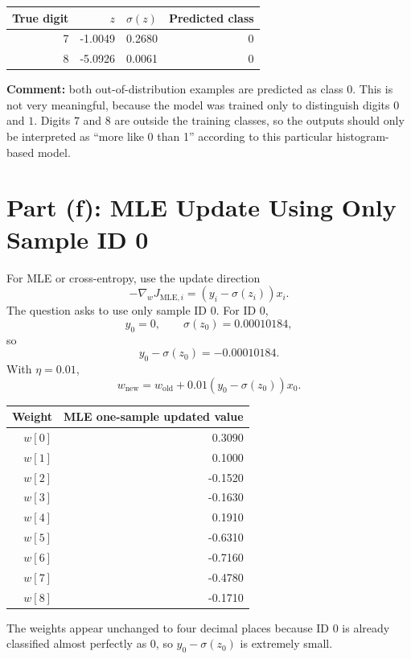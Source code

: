 \documentclass[11pt]{article}
\begin{document}
\begin{center}
\begin{tabular}{rrrr}
\toprule
True digit & \(z\) & \(\sigma(z)\) & Predicted class \\
\midrule
7 & -1.0049 & 0.2680 & 0 \\
8 & -5.0926 & 0.0061 & 0 \\
\bottomrule
\end{tabular}
\end{center}

\textbf{Comment:} both out-of-distribution examples are predicted as class \(0\).
This is not very meaningful, because the model was trained only to distinguish
digits \(0\) and \(1\). Digits \(7\) and \(8\) are outside the training classes, so the
outputs should only be interpreted as ``more like 0 than 1'' according to this
particular histogram-based model.

\section*{Part (f): MLE Update Using Only Sample ID 0}

For MLE or cross-entropy, use the update direction
\[
    -\nabla_w J_{\text{MLE},i}
    =
    (y_i-\sigma(z_i))x_i.
\]
The question asks to use only sample ID 0. For ID 0,
\[
    y_0=0,
    \qquad
    \sigma(z_0)=0.00010184,
\]
so
\[
    y_0-\sigma(z_0) = -0.00010184.
\]
With \(\eta=0.01\),
\[
    w_{\text{new}} = w_{\text{old}} + 0.01(y_0-\sigma(z_0))x_0.
\]

\begin{center}
\begin{tabular}{rr}
\toprule
Weight & MLE one-sample updated value \\
\midrule
\(w[0]\) & 0.3090 \\
\(w[1]\) & 0.1000 \\
\(w[2]\) & -0.1520 \\
\(w[3]\) & -0.1630 \\
\(w[4]\) & 0.1910 \\
\(w[5]\) & -0.6310 \\
\(w[6]\) & -0.7160 \\
\(w[7]\) & -0.4780 \\
\(w[8]\) & -0.1710 \\
\bottomrule
\end{tabular}
\end{center}

The weights appear unchanged to four decimal places because ID 0 is already
classified almost perfectly as \(0\), so \(y_0-\sigma(z_0)\) is extremely small.
\end{document}
